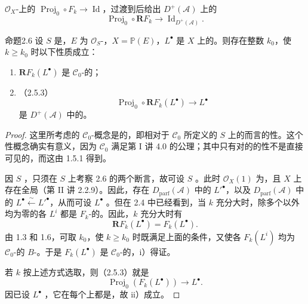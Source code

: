 $\mathcal O_X$-上的 $\operatorname{Proj}_0\circ F_k\to\operatorname{Id}$，过渡到后给出 $D^+(\mathscr A)$ 上的
\[
\operatorname{Proj}_0\circ\mathbf RF_k\longrightarrow\operatorname{Id}_{D^+(\mathscr A)}.\tag{2.5.3}
\]
\begin{SGAresult}{命题}{2.6}
设 $S$ 是，$E$ 为 $\mathcal O_S$-，$X=\mathbb P(E)$，$L^\bullet$ 是 $X$ 上的。则存在整数 $k_0$，使 $k\geq k_0$ 时以下性质成立：
\begin{enumerate}
\item[i)] $\mathbf RF_k(L^\bullet)$ 是 $\mathscr C_0$-的；
\item[ii)] （2.5.3）
\[
\operatorname{Proj}_0\circ\mathbf RF_k(L^\bullet)\longrightarrow L^\bullet
\]
是 $D^+(\mathscr A)$ 中的。
\end{enumerate}
\end{SGAresult}
\begin{proof}
这里所考虑的 $\mathscr C_0$-概念是的，即相对于 $\mathscr C_0$ 所定义的 $S$ 上的而言的性。这个性概念确实有意义，因为 $\mathscr C_0$ 满足第 I 讲 4.0 的公理；其中只有对的的性不是直接可见的，而这由 1.5.1 得到。

因 $S$ ，只须在 $S$ 上考察 2.6 的两个断言，故可设 $S$ 。此时 $\mathcal O_X(1)$ 为，且 $X$ 上存在全局（第 II 讲 2.2.9）。因此，存在 $D_{\mathrm{parf}}(\mathscr A)$ 中的 $L'^\bullet$，以及 $D_{\mathrm{parf}}(\mathscr A)$ 中的 $L^\bullet\xleftarrow{\sim}L'^\bullet$，从而可设 $L^\bullet$ 。但在 2.4 中已经看到，当 $k$ 充分大时，除多个以外均为零的各 $L^i$ 都是 $F_k$-的。因此，$k$ 充分大时有
\[
\mathbf RF_k(L^\bullet)=F_k(L^\bullet).
\]
由 1.3 和 1.6，可取 $k_0$，使 $k\geq k_0$ 时既满足上面的条件，又使各 $F_k(L^i)$ 均为 $\mathscr C_0$-的 $B$-。于是 $F_k(L^\bullet)$ 是 $\mathscr C_0$-的，i）得证。

若 $k$ 按上述方式选取，则（2.5.3）就是
\[
\operatorname{Proj}_0(F_k(L^\bullet))\longrightarrow L^\bullet.
\]
因已设 $L^\bullet$ ，它在每个上都是，故 ii）成立。
\end{proof}
